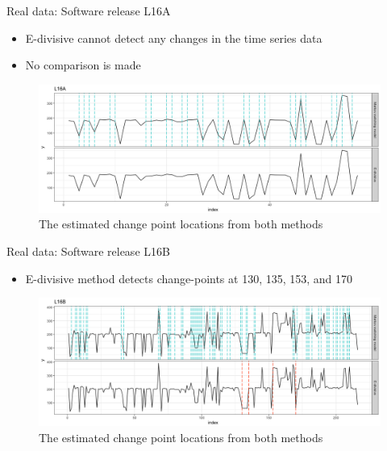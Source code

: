 \documentclass{beamer}
\begin{document}
\begin{frame}
Real data: Software release L16A

\begin{itemize}
	\item E-divisive cannot detect any changes in the time series data
	\item No comparison is made
\end{itemize}

\begin{figure}
	\includegraphics[width=1\linewidth]{compare_L16A}
	\caption{The estimated change point locations from both methods}
\end{figure}

\end{frame}
\begin{frame}
Real data: Software release L16B

\begin{itemize}
	\item E-divisive method detects change-points at 130, 135, 153, and 170
\end{itemize}

\begin{figure}
	\includegraphics[width=1\linewidth]{compare_L16B}
	\caption{The estimated change point locations from both methods}
\end{figure}

\end{frame}
\end{document}
